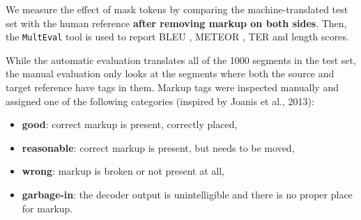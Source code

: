 \documentclass[11pt,letterpaper]{article}
\begin{document}
We measure the effect of mask tokens by comparing the machine-translated test set with the human reference \textbf{after removing markup on both sides}. Then, the \texttt{MultEval} tool is used \cite{clark2011better} to report BLEU \cite{papineni2002bleu}, METEOR \cite{lavie2007meteor}, TER \cite{Snover-et-al-2006} and length scores.

While the automatic evaluation translates all of the 1000 segments in the test set, the manual evaluation only looks at the segments where both the source and target reference have tags in them. Markup tags were inspected manually and assigned one of the following categories (inspired by Joanis et al., 2013):

\vspace{0.2cm}
\begin{itemize}
\item \textbf{good}: correct markup is present, correctly placed,
\item \textbf{reasonable}: correct markup is present, but needs to be moved,
\item \textbf{wrong}: markup is broken or not present at all,
\item \textbf{garbage-in}: the decoder output is unintelligible and there is no proper place for markup.
\end{itemize}
\vspace{0.2cm}



\end{document}
